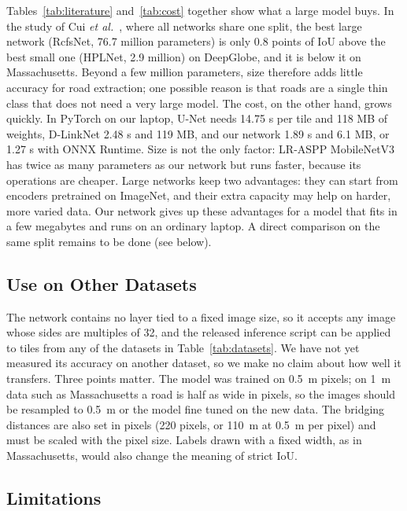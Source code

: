 \documentclass{ieeeaccess}
\begin{document}
Tables~\ref{tab:literature} and~\ref{tab:cost} together show what a large model buys. In the study of Cui \emph{et al.}~\cite{cui2025hplnet}, where all networks share one split, the best large network (RcfsNet, 76.7 million parameters) is only 0.8 points of IoU above the best small one (HPLNet, 2.9 million) on DeepGlobe, and it is below it on Massachusetts. Beyond a few million parameters, size therefore adds little accuracy for road extraction; one possible reason is that roads are a single thin class that does not need a very large model. The cost, on the other hand, grows quickly. In PyTorch on our laptop, U-Net needs 14.75 s per tile and 118 MB of weights, D-LinkNet 2.48 s and 119 MB, and our network 1.89 s and 6.1 MB, or 1.27 s with ONNX Runtime. Size is not the only factor: LR-ASPP MobileNetV3 has twice as many parameters as our network but runs faster, because its operations are cheaper. Large networks keep two advantages: they can start from encoders pretrained on ImageNet, and their extra capacity may help on harder, more varied data. Our network gives up these advantages for a model that fits in a few megabytes and runs on an ordinary laptop. A direct comparison on the same split remains to be done (see below).

\subsection{Use on Other Datasets}

The network contains no layer tied to a fixed image size, so it accepts any image whose sides are multiples of 32, and the released inference script can be applied to tiles from any of the datasets in Table~\ref{tab:datasets}. We have not yet measured its accuracy on another dataset, so we make no claim about how well it transfers. Three points matter. The model was trained on 0.5~m pixels; on 1~m data such as Massachusetts a road is half as wide in pixels, so the images should be resampled to 0.5~m or the model fine tuned on the new data. The bridging distances are also set in pixels (220 pixels, or 110~m at 0.5~m per pixel) and must be scaled with the pixel size. Labels drawn with a fixed width, as in Massachusetts, would also change the meaning of strict IoU.

\subsection{Limitations}
\end{document}
